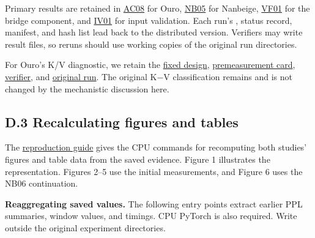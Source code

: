 \documentclass[10pt,a4paper]{article}
\begin{document}
Primary results are retained in \href{https://github.com/metaSATOKEN/nsn/tree/c37d39ea0106274d9f661cfbb268b0ed05319846/runs/loop-kv-ac08-20261002-095022-41c2554c}{AC08} for Ouro, \href{https://github.com/metaSATOKEN/nsn/tree/c37d39ea0106274d9f661cfbb268b0ed05319846/runs/loop-kv-nb05-20261003-090604-18baabf5}{NB05} for Nanbeige, \href{https://github.com/metaSATOKEN/nsn/tree/c37d39ea0106274d9f661cfbb268b0ed05319846/runs/loop-kv-vf01-20261002-072452-1d1c10c0}{VF01} for the bridge component, and \href{https://github.com/metaSATOKEN/nsn/tree/c37d39ea0106274d9f661cfbb268b0ed05319846/runs/loop-kv-iv01-20261001-142907-0c002415}{IV01} for input validation. Each run's \texttt{}, status record, manifest, and hash list lead back to the distributed version. Verifiers may write result files, so reruns should use working copies of the original run directories.

For Ouro's K/V diagnostic, we retain the \href{https://github.com/metaSATOKEN/nsn/blob/c37d39ea0106274d9f661cfbb268b0ed05319846/plans/public/loop-kv-kv01-design-v0.1-2026-09-30.md}{fixed design}, \href{https://github.com/metaSATOKEN/nsn/blob/c37d39ea0106274d9f661cfbb268b0ed05319846/plans/public/loop-kv-kv01-v0.1-2026-09-30.md}{premeasurement card}, \href{https://github.com/metaSATOKEN/nsn/blob/c37d39ea0106274d9f661cfbb268b0ed05319846/scripts/verify_loop_kv_kv01.py}{verifier}, and \href{https://github.com/metaSATOKEN/nsn/tree/c37d39ea0106274d9f661cfbb268b0ed05319846/runs/loop-kv-kv01-20260930-110929-fe60928a}{original run}. The original K−V classification remains \texttt{} and is not changed by the mechanistic discussion here.

\subsection{D.3 Recalculating figures and tables}\label{d.3-recalculating-figures-and-tables}

The \href{https://github.com/metaSATOKEN/nsn/blob/c37d39ea0106274d9f661cfbb268b0ed05319846/REPRODUCIBILITY.md}{reproduction guide} gives the CPU commands for recomputing both studies' figures and table data from the saved evidence. Figure 1 illustrates the representation. Figures 2--5 use the initial measurements, and Figure 6 uses the NB06 continuation.

\textbf{Reaggregating saved values.} The following entry points extract earlier PPL summaries, window values, and timings. CPU PyTorch is also required. Write outside the original experiment directories.
\end{document}
